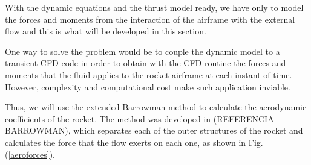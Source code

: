\documentclass[10pt,fleqn,a4paper,twoside]{article}
\begin{document}
With the dynamic equations and the thrust model ready, we have only to model the forces and moments from the interaction of the airframe with the external flow and this is what will be developed in this section.


One way to solve the problem would be to couple the dynamic model to a transient CFD code in order to obtain with the CFD routine the forces and moments that the fluid applies to the rocket airframe at each instant of time. However, complexity and computational cost make such application inviable.


Thus, we will use the extended Barrowman method to calculate the aerodynamic coefficients of the rocket. The method was developed in (REFERENCIA BARROWMAN), which separates each of the outer structures of the rocket and calculates the force that the flow exerts on each one, as shown in Fig. (\ref{aeroforces}).
\end{document}
